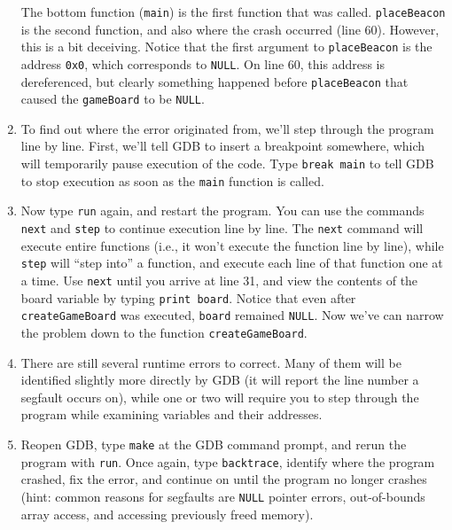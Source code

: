 \documentclass[12pt]{scrartcl}
\begin{document}
\begin{enumerate}
	The bottom function (\texttt{main}) is the first function that was called.  
	\texttt{placeBeacon} is the second function, and also where the crash 
	occurred (line 60).  However, this is a bit deceiving.  Notice that the first 
	argument to \texttt{placeBeacon} is the address \texttt{0x0}, which corresponds
	to \texttt{NULL}.  On line 60, this address is dereferenced, but clearly 
	something happened before \texttt{placeBeacon} that caused the 
	\texttt{gameBoard} to be \texttt{NULL}.
  \item To find out where the error originated from, we'll step through the program 
	line by line.  First, we'll tell GDB to insert a breakpoint somewhere, which 
	will temporarily pause execution of the code.  Type \texttt{break main} to tell 
	GDB to stop execution as soon as the \texttt{main} function is called.
  \item Now type \texttt{run} again, and restart the program.  You can use the commands 
	\texttt{next} and \texttt{step} to continue execution 
	line by line.  The \texttt{next} command will execute entire functions 
	(i.e., it won't execute the function line by line), while 
	\texttt{step} will ``step into'' a function, and execute each line of that 
	function one at a time.  Use \texttt{next} until you arrive at line 31, 
	and view the contents of the board variable by typing \texttt{print board}.  Notice 
	that even after \texttt{createGameBoard} was executed, \texttt{board} 
	remained \texttt{NULL}.  Now we've can narrow the problem down 
	to the function \texttt{createGameBoard}. 
  \item There are still several runtime errors to correct.  Many of them will be identified 
	slightly more directly by GDB (it will report the line number a segfault occurs on), 
	while one or two will require you to step through the program while examining 
	variables and their addresses.
  \item Reopen GDB, type \texttt{make} at the GDB command prompt, and 
	rerun the program with \texttt{run}.  Once again, type \texttt{backtrace}, 
	identify where the program crashed, fix the error, and continue on until the 
	program no longer crashes (hint: common reasons for segfaults are \texttt{NULL} 
	pointer errors,  out-of-bounds array access, and accessing previously freed memory).
\end{enumerate}
\end{document}

